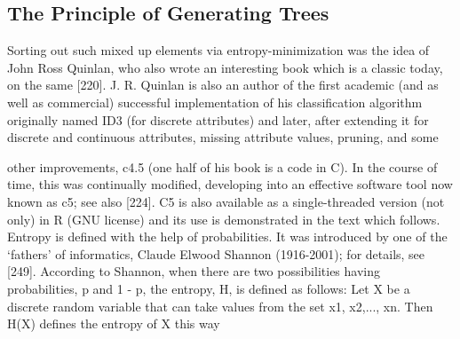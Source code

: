 \documentclass[11pt,openany,executivepaper]{book}
\begin{document}
\subsection{The Principle of Generating Trees}
Sorting out such mixed up elements via entropy-minimization was the idea of
John Ross Quinlan, who also wrote an interesting book which is a classic today,
on the same [220]. J. R. Quinlan is also an author of the first academic (and as
well as commercial) successful implementation of his classification algorithm
originally named ID3 (for discrete attributes) and later, after extending it for
discrete and continuous attributes, missing attribute values, pruning, and some

other improvements, c4.5 (one half of his book is a code in C). In the course
of time, this was continually modified, developing into an effective software tool
now known as c5; see also [224]. C5 is also available as a single-threaded version
(not only) in R (GNU license) and its use is demonstrated in the text which
follows.
Entropy is defined with the help of probabilities. It was introduced by one of
the ‘fathers’ of informatics, Claude Elwood Shannon (1916-2001); for details,
see [249]. According to Shannon, when there are two possibilities having probabilities, p and 1 - p, the entropy, H, is defined as follows: Let X be a discrete
random variable that can take values from the set {x1, x2,..., xn}. Then H(X)
defines the entropy of X this way
\end{document}
